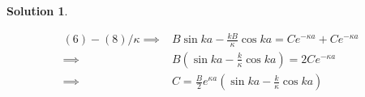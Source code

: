 \documentclass[10pt]{article}
\theoremstyle{definition}
\newtheorem{soln}{Solution}
\begin{document}
\begin{soln}
\begin{enumerate}[label=(\alph*)]
\begin{align*}
            (6)-(8)/\kappa \implies & B \sin ka-\frac{kB}{\kappa}\cos ka = Ce^{-\kappa a}+C e^{-\kappa a}      \\
            \implies                & B \left(\sin ka-\frac{k}{\kappa}\cos ka\right) = 2Ce^{-\kappa a}         \\
            \implies                & C = \frac{B}{2} e^{\kappa a} \left(\sin ka-\frac{k}{\kappa}\cos ka\right)
          \end{align*}
  \end{enumerate}
\end{soln}
\end{document}

